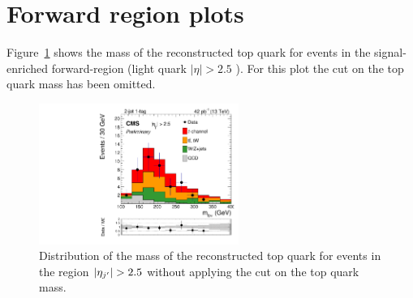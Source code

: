 \section{Forward region plots}
\label{app:forward}
Figure~\ref{fig:forward} shows the mass of the reconstructed top quark for events in the signal-enriched forward-region (light quark $|\eta| > 2.5$ ). For this plot the cut on the top quark mass has been omitted.


\begin{figure}[hbpt]
\begin{center}
\includegraphics[width=6.5cm]{figures/postfit_topm_forward.pdf}
\caption{\label{fig:forward} Distribution of the mass of the reconstructed top quark for events in the region $|\eta_{j^\prime}| > 2.5$ without applying the cut on the top quark mass.}
\end{center}
\end{figure}
